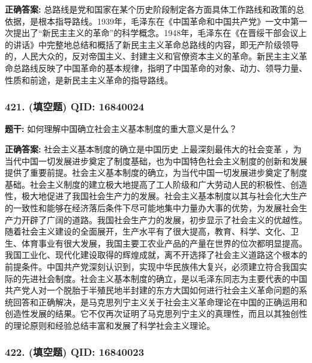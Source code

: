 \documentclass[12pt,UTF8]{ctexart}
\begin{document}
\textbf{正确答案:}
总路线是党和国家在某个历史阶段制定各方面具体工作路线和政策的总依据，是根本指导路线。1939年，毛泽东在《中国革命和中国共产党》一文中第一次提出了“新民主主义的革命”的科学概念。1948年，毛泽东在《在晋绥干部会议上的讲话》中完整地总结和概括了新民主主义革命总路线的内容，即无产阶级领导的，人民大众的，反对帝国主义、封建主义和官僚资本主义的革命。新民主主义革命总路线反映了中国革命的基本规律，指明了中国革命的对象、动力、领导力量、性质和前途，是新民主主义革命的指导路线。

\vspace{0.3em}\hrulefill\vspace{0.7em}

\subsubsection*{421. (填空题) \small QID: 16840024}

\textbf{题干:}
如何理解中国确立社会主义基本制度的重大意义是什么？

\textbf{正确答案:}
社会主义基本制度的确立是中国历史 上最深刻最伟大的社会变革 ，为当代中国一切发展进步奠定了制度基础，也为中国特色社会主义制度的创新和发展提供了重要前提。社会主义基本制度的确立，为当代中国一切发展进步奠定了制度基础。社会主义制度的建立极大地提高了工人阶级和广大劳动人民的积极性、创造性，极大地促进了我国社会生产力的发展。社会主义基本制度以其与社会化大生产的一致性和能够在经济落后条件下尽可能地集中力量办大事的优势，为发展社会生产力开辟了广阔的道路。我国社会生产力的发展，初步显示了社会主义的优越性。随着社会主义建设的全面展开，生产水平有了很大提高，教育、科学、文化、卫生、体育事业有很大发展，我国主要工农业产品的产量在世界的位次都明显提高。我国工业化、现代化建设取得的辉煌成就，离不开选择了社会主义道路这个根本的前提条件。中国共产党深刻认识到，实现中华民族伟大复兴，必须建立符合我国实际的先进社会制度。社会主义基本制度的确立，是以毛泽东同志为主要代表的中国共产党人对一个脱胎于半殖民地半封建的东方大国如何进行社会主义革命问题的系统回答和正确解决，是马克思列宁主义关于社会主义革命理论在中国的正确运用和创造性发展的结果。它不仅再次证明了马克思列宁主义的真理性，而且以其独创性的理论原则和经验总结丰富和发展了科学社会主义理论。

\vspace{0.3em}\hrulefill\vspace{0.7em}

\subsubsection*{422. (填空题) \small QID: 16840023}
\end{document}

